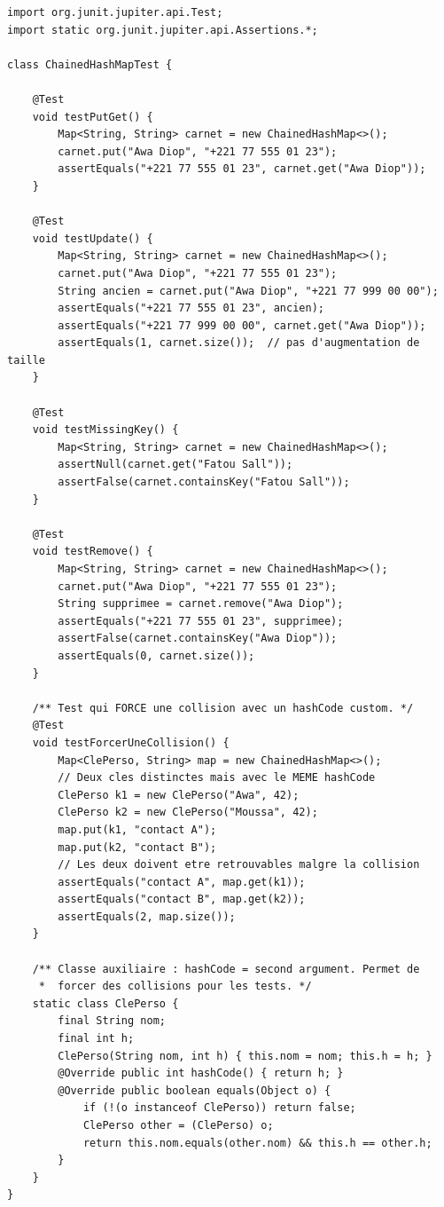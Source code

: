 \documentclass[11pt,a4paper]{article}
\begin{document}
\begin{lstlisting}[style=java]
import org.junit.jupiter.api.Test;
import static org.junit.jupiter.api.Assertions.*;

class ChainedHashMapTest {

    @Test
    void testPutGet() {
        Map<String, String> carnet = new ChainedHashMap<>();
        carnet.put("Awa Diop", "+221 77 555 01 23");
        assertEquals("+221 77 555 01 23", carnet.get("Awa Diop"));
    }

    @Test
    void testUpdate() {
        Map<String, String> carnet = new ChainedHashMap<>();
        carnet.put("Awa Diop", "+221 77 555 01 23");
        String ancien = carnet.put("Awa Diop", "+221 77 999 00 00");
        assertEquals("+221 77 555 01 23", ancien);
        assertEquals("+221 77 999 00 00", carnet.get("Awa Diop"));
        assertEquals(1, carnet.size());  // pas d'augmentation de taille
    }

    @Test
    void testMissingKey() {
        Map<String, String> carnet = new ChainedHashMap<>();
        assertNull(carnet.get("Fatou Sall"));
        assertFalse(carnet.containsKey("Fatou Sall"));
    }

    @Test
    void testRemove() {
        Map<String, String> carnet = new ChainedHashMap<>();
        carnet.put("Awa Diop", "+221 77 555 01 23");
        String supprimee = carnet.remove("Awa Diop");
        assertEquals("+221 77 555 01 23", supprimee);
        assertFalse(carnet.containsKey("Awa Diop"));
        assertEquals(0, carnet.size());
    }

    /** Test qui FORCE une collision avec un hashCode custom. */
    @Test
    void testForcerUneCollision() {
        Map<ClePerso, String> map = new ChainedHashMap<>();
        // Deux cles distinctes mais avec le MEME hashCode
        ClePerso k1 = new ClePerso("Awa", 42);
        ClePerso k2 = new ClePerso("Moussa", 42);
        map.put(k1, "contact A");
        map.put(k2, "contact B");
        // Les deux doivent etre retrouvables malgre la collision
        assertEquals("contact A", map.get(k1));
        assertEquals("contact B", map.get(k2));
        assertEquals(2, map.size());
    }

    /** Classe auxiliaire : hashCode = second argument. Permet de
     *  forcer des collisions pour les tests. */
    static class ClePerso {
        final String nom;
        final int h;
        ClePerso(String nom, int h) { this.nom = nom; this.h = h; }
        @Override public int hashCode() { return h; }
        @Override public boolean equals(Object o) {
            if (!(o instanceof ClePerso)) return false;
            ClePerso other = (ClePerso) o;
            return this.nom.equals(other.nom) && this.h == other.h;
        }
    }
}
\end{lstlisting}
\end{document}
